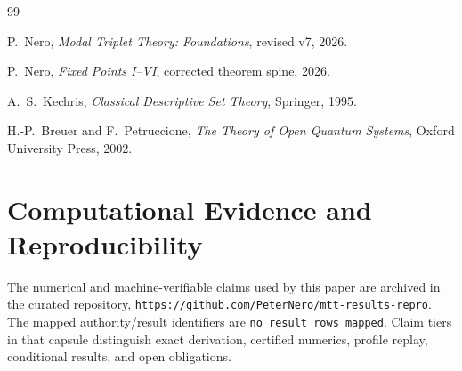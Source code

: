 \documentclass[11pt]{article}
\begin{document}
\begin{thebibliography}{99}

P.~Nero,
\newblock \emph{Modal Triplet Theory: Foundations}, revised v7, 2026.

P.~Nero,
\newblock \emph{Fixed Points I--VI}, corrected theorem spine, 2026.

A.~S.~Kechris,
\newblock \emph{Classical Descriptive Set Theory},
\newblock Springer, 1995.

H.-P.~Breuer and F.~Petruccione,
\newblock \emph{The Theory of Open Quantum Systems},
\newblock Oxford University Press, 2002.

\end{thebibliography}

\section*{Computational Evidence and Reproducibility}
The numerical and machine-verifiable claims used by this paper are archived in the curated repository, \texttt{https://github.com/PeterNero/mtt-results-repro}. The mapped authority/result identifiers are \texttt{no result rows mapped}. Claim tiers in that capsule distinguish exact derivation, certified numerics, profile replay, conditional results, and open obligations.
\end{document}
